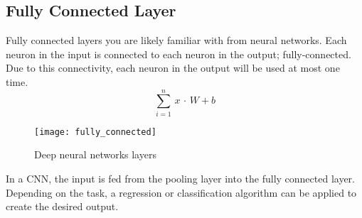 \subsection{Fully Connected Layer}
\label{ssec:fully_connected}
Fully connected layers you are likely familiar with from neural networks.
Each neuron in the input is connected to each neuron in the output;
fully-connected.
Due to this connectivity, each neuron in the output will be used at most one
time.
%
\begin{equation}
  \sum_{i=1}^{n} \,  x \, \cdot \, W+b
\end{equation}
%
\begin{figure}[htb]
\centering
\texttt{[image: fully\_connected]}
\caption{Deep neural networks layers}
\label{fig:fully_connected}
\end{figure}
%
In a CNN, the input is fed from the pooling layer into the fully connected layer.
Depending on the task, a regression or classification algorithm can be applied
to create the desired output.
%